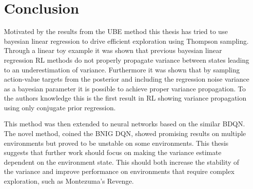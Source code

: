 
\chapter{Conclusion}\label{ch:conc}

Motivated by the results from the UBE method\citep{donoghue_2017} this thesis has tried to use bayesian linear regression to drive efficient exploration using Thompson sampling. Through a linear toy example it was shown that previous bayesian linear regression RL methods do not properly propagate variance between states leading to an underestimation of variance. Furthermore it was shown that by sampling action-value targets from the posterior and including the regression noise variance as a bayesian parameter it is possible to achieve proper variance propagation. To the authors knowledge this is the first result in RL showing variance propagation using only conjugate prior regression.

This method was then extended to neural networks based on the similar \cite{azziz_2018} BDQN. The novel method, coined the BNIG DQN, showed promising results on multiple environments but proved to be unstable on some environments. This thesis suggests that further work should focus on making the variance estimate dependent on the environment state. This should both increase the stability of the variance and improve performance on environments that require complex exploration, such as Montezuma's Revenge.

\cleardoublepage